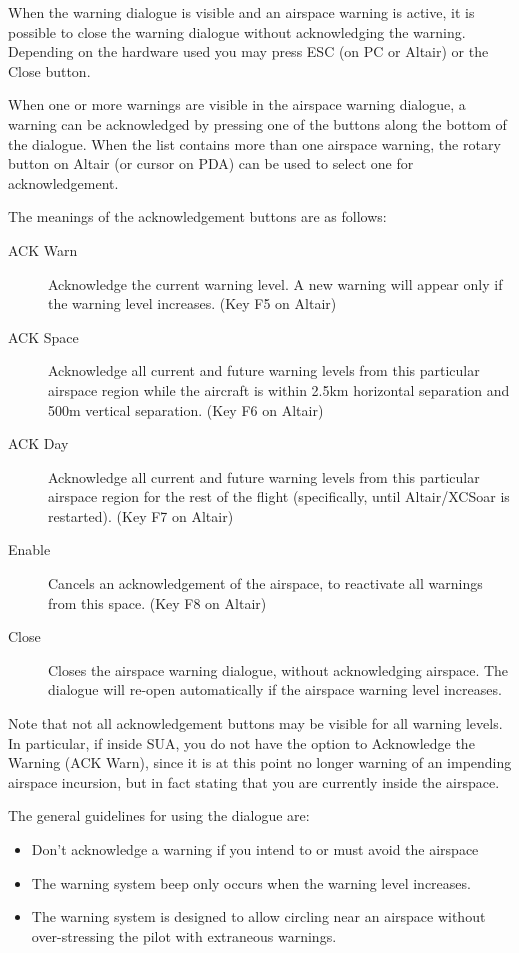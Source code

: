 When the warning dialogue is visible and an airspace warning is
active, it is possible to close the warning dialogue without acknowledging the warning.
Depending on the hardware used you may press ESC (on PC or Altair) or the Close button.

When one or more warnings are visible in the airspace warning dialogue,
a warning can be acknowledged by pressing one of the buttons along the bottom
of the dialogue.  When the list contains more than one airspace warning,
the rotary button on Altair (or cursor on PDA) can be used to select one
for acknowledgement.

The meanings of the acknowledgement buttons are as follows:
\begin{description}
\item[ACK Warn]  Acknowledge the current warning level.  A new warning will appear
only if the warning level increases.  (Key F5 on Altair)
\item[ACK Space]  Acknowledge all current and future warning levels from this 
particular airspace region while the aircraft is within 2.5km horizontal separation
and 500m vertical separation. (Key F6 on Altair)
\item[ACK Day]  Acknowledge all current and future warning levels from this particular
airspace region for the rest of the flight (specifically, until Altair/XCSoar 
is restarted). (Key F7 on Altair)
\item[Enable]  Cancels an acknowledgement of the airspace, to reactivate all warnings
from this space. (Key F8 on Altair)
\item[Close] Closes the airspace warning dialogue, without acknowledging airspace.
  The dialogue will re-open automatically if the airspace warning level increases.
\end{description}

Note that not all acknowledgement buttons may be visible for all
warning levels.  In particular, if inside SUA, you do not have the
option to Acknowledge the Warning (ACK Warn), since it is at this
point no longer warning of an impending airspace incursion, but in
fact stating that you are currently inside the airspace.

The general guidelines for using the dialogue are:
\begin{itemize}
\item  Don't acknowledge a warning if you intend to or must avoid the airspace
\item  The warning system beep only occurs when the warning level increases.
\item  The warning system is designed to allow circling near an airspace without
  over-stressing the pilot with extraneous warnings.
\end{itemize}

